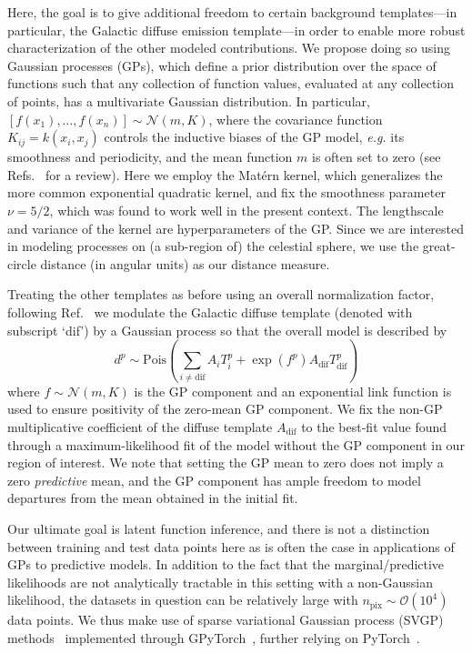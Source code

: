 \documentclass[]{article}
\begin{document}
Here, the goal is to give additional freedom to certain background templates---in particular, the Galactic diffuse emission template---in order to enable more robust characterization of the other modeled contributions. We propose doing so using Gaussian processes (GPs), which define a prior distribution over the space of functions such that any collection of function values, evaluated at any collection of points, has a multivariate Gaussian distribution. In particular, $\left[f\left(x_{1}\right), \ldots, f\left(x_{n}\right)\right] \sim \mathcal{N}(m, K)$,
where the covariance function $K_{i j}=k\left(x_{i}, x_{j}\right)$ controls the inductive biases of the GP model, \emph{e.g.} its smoothness and periodicity, and the mean function $m$ is often set to zero (see Refs.~\cite{10.5555/1162254,wilson2014covariance} for a review). Here we employ the Matérn kernel, which generalizes the more common exponential quadratic kernel, and fix the smoothness parameter $\nu = 5/2$, which was found to work well in the present context. The lengthscale and variance of the kernel are hyperparameters of the GP. Since we are interested in modeling processes on (a sub-region of) the celestial sphere, we use the great-circle distance (in angular units) as our distance measure.

Treating the other templates as before using an overall normalization factor, following Ref.~\cite{Buschmann:2020adf} we modulate the Galactic diffuse template (denoted with subscript `dif') by a Gaussian process so that the overall model is described by
%
\begin{equation}
  d^{p} \sim \mathrm{Pois}\left(\sum_{i\neq\mathrm{dif}} A_i T_{i}^{p} + \exp\left(f^{p}\right)A_\mathrm{dif}T_\mathrm{dif}^{p}\right)
  \label{eq:poisson_gp}
\end{equation}
%
where $f\sim \mathcal{N}\left(m, K\right)$ is the GP component and an exponential link function is used to ensure positivity of the zero-mean GP component. We fix the non-GP multiplicative coefficient of the diffuse template $A_\mathrm{dif}$ to the best-fit value found through a maximum-likelihood fit of the model without the GP component in our region of interest. We note that setting the GP mean to zero does not imply a zero \emph{predictive} mean, and the GP component has ample freedom to model departures from the mean obtained in the initial fit.

Our ultimate goal is latent function inference, and there is not a distinction between training and test data points here as is often the case in applications of GPs to predictive models. In addition to the fact that the marginal/predictive likelihoods are not analytically tractable in this setting with a non-Gaussian likelihood, the datasets in question can be relatively large with $n_\mathrm{pix} \sim\mathcal{O}(10^4)$ data points. We thus make use of sparse variational Gaussian process (SVGP) methods~\cite{quinonero-candela_unifying_2005} implemented through GPyTorch~\cite{gardner2018gpytorch}, further relying on PyTorch~\cite{NEURIPS2019_9015}.
\end{document}
